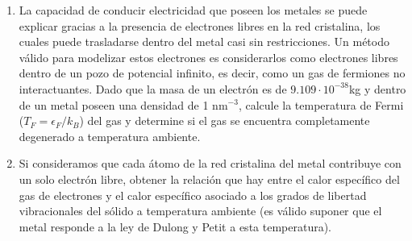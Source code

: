 \documentclass[a4paper,11pt]{article}
\begin{document}
\begin{enumerate}[label=(\alph*),
                  leftmargin=2\parindent,
                  rightmargin=2\parindent]
{          Si definimos $\Delta E = E(T) - E(T=0)$, el calor específico
          puede calcularse como:
          $$
          C_V =
          \left( \frac{\partial \Delta E}{\partial T} \right)_{N, V},
          $$
          ya que restarle la energía del estado fundamental es
          equivalente a un corrimiento rígido de la energía.

          Suponiendo que la cantidad de partículas en el gas no varía
          significativamente para temperaturas cercanas al cero
          absoluto, la diferencia entre $N(T)$ y $N(T=0)$ es
          aproximadamente nula, y por ende puede ser introducida en la
          expresión de $\Delta E$ (siendo previamente multiplicada por
          $\epsilon_F$).
          Esta nueva expresión de $\Delta E$ es posible derivarla con
          respecto a la temperatura para obtener una expresión del
          calor específico.

          Demostrar entonces, que a través de este método obtenemos
          el primer término del desarrollo de Sommerfeld:
          $$ C_V \simeq N k \frac{\pi^2}{2} \frac{kT}{\epsilon_F}. $$
         }

    \item{La capacidad de conducir electricidad que poseen los metales se
          puede explicar gracias a la presencia de electrones libres en la
          red cristalina, los cuales puede trasladarse dentro del metal casi
          sin restricciones.
          Un método válido para modelizar estos electrones es
          considerarlos como electrones libres dentro de un pozo de
          potencial infinito, es decir, como un gas de fermiones no
          interactuantes.
          Dado que la masa de un electrón es de $9.109 \cdot
          10^{-38}$kg y dentro de un metal poseen una densidad de 1
          nm$^{-3}$, calcule la temperatura de Fermi
          ($T_F = \epsilon_F/k_B$) del gas y determine si el gas se
          encuentra completamente degenerado a temperatura ambiente.
          }

    \item{Si consideramos que cada átomo de la red cristalina del
          metal contribuye con un solo electrón libre, obtener la relación
          que hay entre el calor específico del gas de electrones y el calor
          específico asociado a los grados de libertad vibracionales del
          sólido a temperatura ambiente (es válido suponer que el metal
          responde a la ley de Dulong y Petit a esta temperatura).
          }

\end{enumerate}
\end{document}
